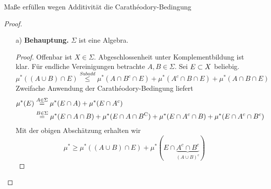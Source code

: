 \documentclass[skript.tex]{subfiles}
\begin{document}
	\begin{bem*}
		Maße erfüllen wegen Additivität die Carathéodory-Bedingung
	\end{bem*}

	\begin{proof}\hfill
	\begin{itemize}
		\item[a)] \textbf{Behauptung.} $\Sigma$ ist eine Algebra.
			\begin{proof}
				Offenbar ist $X\in\Sigma$. Abgeschlossenheit unter Komplementbildung ist klar. Für endliche Vereinigungen betrachte $A,B\in\Sigma$. Sei $E \subset X$ beliebig.
				\begin{equation*}
					\mu^*((A \cup B)\cap E) \stackrel{Subadd}\leq \mu^*(A\cap B^c \cap E)+ \mu^*(A^c \cap B \cap E) + \mu^*(A \cap B \cap E)
				\end{equation*}
				Zweifache Anwendung der Carathéodory-Bedingung liefert
				\begin{align*}
					\mu^*(E)&\stackrel{A\in\Sigma}{=}\mu^*(E\cap A)+\mu^*(E\cap A^c) \\
					&\stackrel{B\in\Sigma}{=}\mu^*(E\cap A\cap B)+ \mu^*(E\cap A\cap B^\mathrm{C})+\mu^*(E\cap A^c\cap B)+\mu^*(E\cap A^c\cap B^c)
				\end{align*}
				Mit der obigen Abschätzung erhalten wir
				\begin{equation*}
					\mu^*\geq\mu^*((A\cup B)\cap E)+ \mu^*(E\cap \underbrace{A^c\cap B^c}_{(A\cup B)^c})
				\end{equation*}
			\end{proof}


\end{itemize}
\end{proof}
\end{document}

